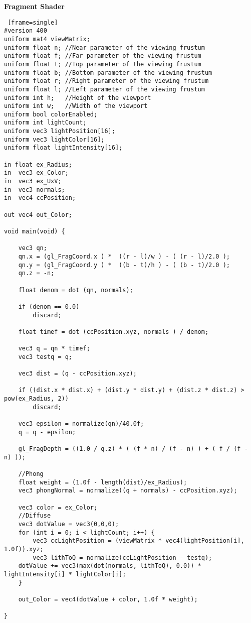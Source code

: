 \textbf{Fragment Shader}
\begin{lstlisting} [frame=single]
#version 400
uniform mat4 viewMatrix;
uniform float n; //Near parameter of the viewing frustum
uniform float f; //Far parameter of the viewing frustum
uniform float t; //Top parameter of the viewing frustum
uniform float b; //Bottom parameter of the viewing frustum
uniform float r; //Right parameter of the viewing frustum
uniform float l; //Left parameter of the viewing frustum
uniform int h; 	 //Height of the viewport
uniform int w; 	 //Width of the viewport
uniform bool colorEnabled;
uniform int lightCount;
uniform vec3 lightPosition[16];
uniform vec3 lightColor[16];
uniform float lightIntensity[16];

in float ex_Radius;
in  vec3 ex_Color;
in 	vec3 ex_UxV;
in  vec3 normals;
in 	vec4 ccPosition;

out vec4 out_Color;

void main(void) {

	vec3 qn;
	qn.x = (gl_FragCoord.x ) *  ((r - l)/w ) - ( (r - l)/2.0 );
	qn.y = (gl_FragCoord.y ) *  ((b - t)/h ) - ( (b - t)/2.0 );
	qn.z = -n;

	float denom = dot (qn, normals);

	if (denom == 0.0)
		discard;

	float timef = dot (ccPosition.xyz, normals ) / denom;

	vec3 q = qn * timef;
	vec3 testq = q;

	vec3 dist = (q - ccPosition.xyz);

	if ((dist.x * dist.x) + (dist.y * dist.y) + (dist.z * dist.z) > pow(ex_Radius, 2))
		discard;

	vec3 epsilon = normalize(qn)/40.0f;
	q = q - epsilon;

	gl_FragDepth = ((1.0 / q.z) * ( (f * n) / (f - n) ) + ( f / (f - n) ));

	//Phong
	float weight = (1.0f - length(dist)/ex_Radius);
	vec3 phongNormal = normalize((q + normals) - ccPosition.xyz);

	vec3 color = ex_Color;
	//Diffuse
	vec3 dotValue = vec3(0,0,0);
	for (int i = 0; i < lightCount; i++) {
		vec3 ccLightPosition = (viewMatrix * vec4(lightPosition[i], 1.0f)).xyz;
		vec3 lithToQ = normalize(ccLightPosition - testq);
	dotValue += vec3(max(dot(normals, lithToQ), 0.0)) * lightIntensity[i] * lightColor[i];
	}

	out_Color = vec4(dotValue + color, 1.0f * weight);

}
\end{lstlisting}
\newpage

